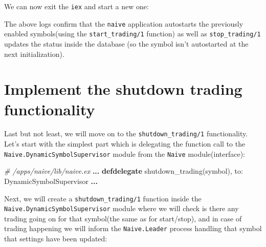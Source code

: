 \documentclass[
]{book}
\newenvironment{Shaded}{\begin{snugshade}}{\end{snugshade}}
\newcommand{\AttributeTok}[1]{\textcolor[rgb]{0.77,0.63,0.00}{#1}}
\newcommand{\CommentTok}[1]{\textcolor[rgb]{0.56,0.35,0.01}{\textit{#1}}}
\newcommand{\ConstantTok}[1]{\textcolor[rgb]{0.00,0.00,0.00}{#1}}
\newcommand{\ControlFlowTok}[1]{\textcolor[rgb]{0.13,0.29,0.53}{\textbf{#1}}}
\newcommand{\ErrorTok}[1]{\textcolor[rgb]{0.64,0.00,0.00}{\textbf{#1}}}
\newcommand{\ExtensionTok}[1]{#1}
\newcommand{\KeywordTok}[1]{\textcolor[rgb]{0.13,0.29,0.53}{\textbf{#1}}}
\newcommand{\NormalTok}[1]{#1}
\newcommand{\OperatorTok}[1]{\textcolor[rgb]{0.81,0.36,0.00}{\textbf{#1}}}
\newcommand{\VariableTok}[1]{\textcolor[rgb]{0.00,0.00,0.00}{#1}}
\begin{document}
We can now exit the \texttt{iex} and start a new one:

\begin{Shaded}
\end{Shaded}

The above logs confirm that the \texttt{naive} application autostarts the previously enabled symbols(using the \texttt{start\_trading/1} function) as well as \texttt{stop\_trading/1} updates the status inside the database (so the symbol isn't autostarted at the next initialization).

\hypertarget{implement-the-shutdown-trading-functionality}{%
\section{Implement the shutdown trading functionality}\label{implement-the-shutdown-trading-functionality}}

Last but not least, we will move on to the \texttt{shutdown\_trading/1} functionality. Let's start with the simplest part which is delegating the function call to the \texttt{Naive.DynamicSymbolSupervisor} module from the \texttt{Naive} module(interface):

\begin{Shaded}
\begin{Highlighting}[]
  \CommentTok{\# /apps/naive/lib/naive.ex}
  \OperatorTok{...}
  \KeywordTok{defdelegate}\NormalTok{ shutdown\_trading(symbol), }\VariableTok{to:} \ConstantTok{DynamicSymbolSupervisor}
  \OperatorTok{...}
\end{Highlighting}
\end{Shaded}

Next, we will create a \texttt{shutdown\_trading/1} function inside the \texttt{Naive.DynamicSymbolSupervisor} module where we will check is there any trading going on for that symbol(the same as for start/stop), and in case of trading happening we will inform the \texttt{Naive.Leader} process handling that symbol that settings have been updated:
\end{document}
